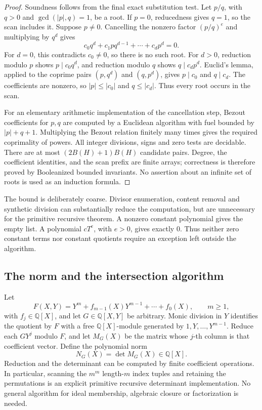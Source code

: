 \begin{proof}
Soundness follows from the final exact substitution test.  Let
\(p/q\), with \(q>0\) and \(\gcd(|p|,q)=1\), be a root.
If \(p=0\), reducedness gives \(q=1\), so the scan includes it.
Suppose \(p\ne0\).  Cancelling the nonzero factor \((p/q)^e\)
and multiplying by \(q^d\) gives
\[
 c_0q^d+c_1pq^{d-1}+\cdots+c_dp^d=0.
 \tag{RR2}\label{eq:norm-cleared-root}
\]
For \(d=0\), this contradicts \(c_0\ne0\), so there is no such
root.  For \(d>0\), reduction modulo \(p\) shows
\(p\mid c_0q^d\), and reduction modulo \(q\) shows
\(q\mid c_dp^d\).  Euclid's lemma, applied to the coprime pairs
\((p,q^d)\) and \((q,p^d)\), gives
\(p\mid c_0\) and \(q\mid c_d\).  The coefficients are nonzero,
so \(|p|\le|c_0|\) and \(q\le|c_d|\).  Thus every root occurs in
the scan.

For an elementary arithmetic implementation of the cancellation step,
Bezout coefficients for \(p,q\) are computed by a Euclidean algorithm
with fuel bounded by \(|p|+q+1\).  Multiplying the Bezout relation
finitely many times gives the required coprimality of powers.
All integer divisions, signs and zero tests are decidable.  There are
at most \((2B(H)+1)B(H)\) candidate pairs.  Degree, the coefficient
identities, and the scan prefix are finite arrays; correctness is
therefore proved by Booleanized bounded invariants.  No assertion
about an infinite set of roots is used as an induction formula.
\end{proof}

The bound is deliberately coarse.  Divisor enumeration, content
removal and synthetic division can substantially reduce the computation,
but are unnecessary for the primitive recursive theorem.  A nonzero
constant polynomial gives the empty list.  A polynomial \(cT^e\),
with \(e>0\), gives exactly \(0\).  Thus neither zero constant terms
nor constant quotients require an exception left outside the algorithm.

\subsection{The norm and the intersection algorithm}

Let
\[
 F(X,Y)=Y^m+f_{m-1}(X)Y^{m-1}+\cdots+f_0(X),
 \qquad m\ge1,
\]
with \(f_j\in\mathbb Q[X]\), and let \(G\in\mathbb Q[X,Y]\)
be arbitrary.  Monic division in \(Y\) identifies the quotient by
\(F\) with a free \(\mathbb Q[X]\)-module generated by
\(1,Y,\ldots,Y^{m-1}\).  Reduce each \(GY^j\) modulo \(F\),
and let \(M_G(X)\) be the matrix whose \(j\)-th column is that
coefficient vector.  Define the polynomial norm
\[
 N_G(X)=\det M_G(X)\in\mathbb Q[X].
\]
Reduction and the determinant can be computed by finite coefficient
operations.  In particular, scanning the \(m^m\) length-\(m\)
index tuples and retaining the permutations is an explicit primitive
recursive determinant implementation.  No general algorithm for ideal
membership, algebraic closure or factorization is needed.

